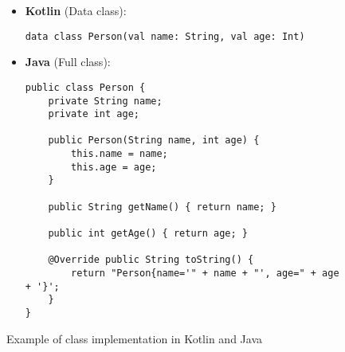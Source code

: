 \begin{figure}[H]
\centering
\begin{tcolorbox}[colframe=blue!80!black, colback=blue!5!white, coltitle=blue!50!black, title={-}, boxrule=0.5mm, width=0.8\textwidth, sharp corners=south]
    \begin{itemize}
    \vspace{0.2cm}
        \item \textbf{\scriptsize Kotlin} \scriptsize (Data class):
        \begin{lstlisting}[style=kotlin, basicstyle=\scriptsize\ttfamily]
data class Person(val name: String, val age: Int)
        \end{lstlisting}
        
        \item \textbf{\scriptsize Java} \scriptsize (Full class):
        \begin{lstlisting}[style=java, basicstyle=\scriptsize\ttfamily]
public class Person {
    private String name;
    private int age;

    public Person(String name, int age) {
        this.name = name;
        this.age = age;
    }

    public String getName() { return name; }

    public int getAge() { return age; }

    @Override public String toString() { 
        return "Person{name='" + name + "', age=" + age + '}'; 
    }
}
        \end{lstlisting}
    \end{itemize}
\end{tcolorbox}
\caption{Example of class implementation in Kotlin and Java}
\label{fig:class_implementation}
\end{figure}

\vspace{1cm}

